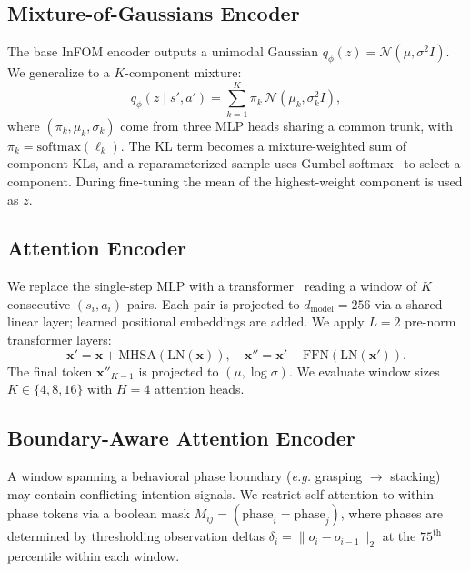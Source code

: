 \documentclass{article}
\newcommand{\eg}{\textit{e.g.}}
\newcommand{\base}{InFOM}
\begin{document}
\subsection{Mixture-of-Gaussians Encoder}
\label{sec:mog}

The base \base{} encoder outputs a unimodal Gaussian
$q_\phi(z) = \mathcal{N}(\mu,\sigma^2 I)$.
We generalize to a $K$-component mixture:
\begin{equation}
    q_\phi(z \mid s', a') = \sum_{k=1}^{K} \pi_k
    \,\mathcal{N}(\mu_k, \sigma_k^2 I),
\end{equation}
where $(\pi_k,\mu_k,\sigma_k)$ come from three MLP heads sharing a
common trunk, with $\pi_k = \mathrm{softmax}(\ell_k)$.
The KL term becomes a mixture-weighted sum of component KLs, and a
reparameterized sample uses Gumbel-softmax~\citep{jang2017gumbel}
to select a component.
During fine-tuning the mean of the highest-weight component is used as $z$.

\subsection{Attention Encoder}
\label{sec:attention}

We replace the single-step MLP with a transformer~\citep{vaswani2017attention}
reading a window of $K$ consecutive $(s_i,a_i)$ pairs.
Each pair is projected to $d_\text{model}=256$ via a shared linear layer;
learned positional embeddings are added.
We apply $L=2$ pre-norm transformer layers:
\begin{equation}
\mathbf{x}' = \mathbf{x} + \mathrm{MHSA}(\mathrm{LN}(\mathbf{x})),
\quad
\mathbf{x}'' = \mathbf{x}' + \mathrm{FFN}(\mathrm{LN}(\mathbf{x}')).
\end{equation}
The final token $\mathbf{x}''_{K-1}$ is projected to $(\mu,\log\sigma)$.
We evaluate window sizes $K \in \{4, 8, 16\}$ with $H=4$ attention heads.

\subsection{Boundary-Aware Attention Encoder}
\label{sec:boundary}

A window spanning a behavioral phase boundary (\eg{} grasping
$\to$ stacking) may contain conflicting intention signals.
We restrict self-attention to within-phase tokens via a boolean mask
$M_{ij} = (\text{phase}_i = \text{phase}_j)$, where phases are determined
by thresholding observation deltas $\delta_i = \|o_i - o_{i-1}\|_2$
at the $75^\text{th}$ percentile within each window.
\end{document}
